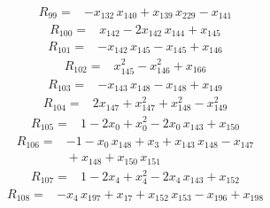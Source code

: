 \documentclass[11pt]{article}
\begin{document}
\begin{equation*}\begin{aligned}
R_{99}={}&-x_{132}\,x_{140} + x_{139}\,x_{229} - x_{141}
\end{aligned}\end{equation*}
\begin{equation*}\begin{aligned}
R_{100}={}&x_{142} - 2x_{142}\,x_{144} + x_{145}
\end{aligned}\end{equation*}
\begin{equation*}\begin{aligned}
R_{101}={}&-x_{142}\,x_{145} - x_{145} + x_{146}
\end{aligned}\end{equation*}
\begin{equation*}\begin{aligned}
R_{102}={}&x_{145}^{2} - x_{146}^{2} + x_{166}
\end{aligned}\end{equation*}
\begin{equation*}\begin{aligned}
R_{103}={}&-x_{143}\,x_{148} - x_{148} + x_{149}
\end{aligned}\end{equation*}
\begin{equation*}\begin{aligned}
R_{104}={}&2x_{147} + x_{147}^{2} + x_{148}^{2} - x_{149}^{2}
\end{aligned}\end{equation*}
\begin{equation*}\begin{aligned}
R_{105}={}&1 - 2x_{0} + x_{0}^{2} - 2x_{0}\,x_{143} + x_{150}
\end{aligned}\end{equation*}
\begin{equation*}\begin{aligned}
R_{106}={}&-1 - x_{0}\,x_{148} + x_{3} + x_{143}\,x_{148} - x_{147} \\
&{} + x_{148} + x_{150}\,x_{151}
\end{aligned}\end{equation*}
\begin{equation*}\begin{aligned}
R_{107}={}&1 - 2x_{4} + x_{4}^{2} - 2x_{4}\,x_{143} + x_{152}
\end{aligned}\end{equation*}
\begin{equation*}\begin{aligned}
R_{108}={}&-x_{4}\,x_{197} + x_{17} + x_{152}\,x_{153} - x_{196} + x_{198}
\end{aligned}\end{equation*}
\end{document}
